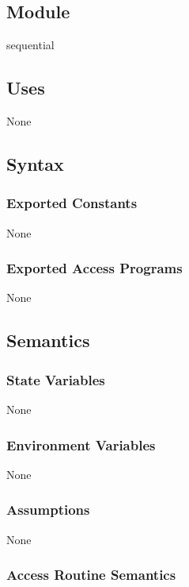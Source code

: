 \documentclass[12pt, titlepage]{article}
\begin{document}
\subsection{Module}

sequential

\subsection{Uses}

None

\subsection{Syntax}

\subsubsection{Exported Constants}

None

\subsubsection{Exported Access Programs}

None

\subsection{Semantics}

\subsubsection{State Variables}

None

\subsubsection{Environment Variables}

None

\subsubsection{Assumptions}

None

\subsubsection{Access Routine Semantics}
\end{document}
